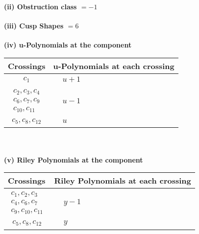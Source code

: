 \documentclass[1p]{elsarticle_modified}
\theoremstyle{definition}
\begin{document}
\flushleft \textbf{(ii) Obstruction class $= -1$}\\~\\
\flushleft \textbf{(iii) Cusp Shapes $= 6$}\\~\\
\newpage\renewcommand{\arraystretch}{1}
\flushleft \textbf{(iv) u-Polynomials at the component}\newline \\
\begin{tabular}{m{50pt}|m{274pt}}
Crossings & \hspace{64pt}u-Polynomials at each crossing \\
\hline $$\begin{aligned}c_{1}\end{aligned}$$&$\begin{aligned}
&u+1
\end{aligned}$\\
\hline $$\begin{aligned}c_{2},c_{3},c_{4}\\c_{6},c_{7},c_{9}\\c_{10},c_{11}\end{aligned}$$&$\begin{aligned}
&u-1
\end{aligned}$\\
\hline $$\begin{aligned}c_{5},c_{8},c_{12}\end{aligned}$$&$\begin{aligned}
&u
\end{aligned}$\\
\hline
\end{tabular}\\~\\
\newpage\renewcommand{\arraystretch}{1}
\flushleft \textbf{(v) Riley Polynomials at the component}\newline \\
\begin{tabular}{m{50pt}|m{274pt}}
Crossings & \hspace{64pt}Riley Polynomials at each crossing \\
\hline $$\begin{aligned}c_{1},c_{2},c_{3}\\c_{4},c_{6},c_{7}\\c_{9},c_{10},c_{11}\end{aligned}$$&$\begin{aligned}
&y-1
\end{aligned}$\\
\hline $$\begin{aligned}c_{5},c_{8},c_{12}\end{aligned}$$&$\begin{aligned}
&y
\end{aligned}$\\
\hline
\end{tabular}\\~\\
\end{document}
